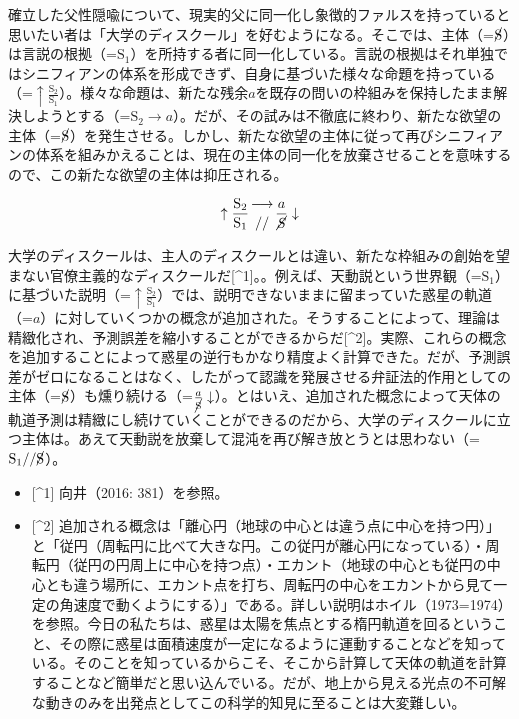 確立した父性隠喩について、現実的父に同一化し象徴的ファルスを持っていると思いたい者は「大学のディスクール」を好むようになる。そこでは、主体（=\(\cancel{\textrm{S}}\)）は言説の根拠（=\(\textrm{S}_1\)）を所持する者に同一化している。言説の根拠はそれ単独ではシニフィアンの体系を形成できず、自身に基づいた様々な命題を持っている（=\(\uparrow\frac{\textrm{S}_2}{\textrm{S}_1}\)）。様々な命題は、新たな残余\(a\)を既存の問いの枠組みを保持したまま解決しようとする（=\(\textrm{S}_2\rightarrow a\)）。だが、その試みは不徹底に終わり、新たな欲望の主体（=\(\cancel{\textrm{S}}\)）を発生させる。しかし、新たな欲望の主体に従って再びシニフィアンの体系を組みかえることは、現在の主体の同一化を放棄させることを意味するので、この新たな欲望の主体は抑圧される。

\[
\uparrow\frac{\mathrm{S_2}}{\mathrm{S_1}}\genfrac{}{}{0pt}{}{\longrightarrow}{//}\frac{a}{\mathrm{\cancel{S}}}\downarrow
\]

大学のディスクールは、主人のディスクールとは違い、新たな枠組みの創始を望まない官僚主義的なディスクールだ{[}\^{}1{]}。。例えば、天動説という世界観（=\(\textrm{S}_1\)）に基づいた説明（=\(\uparrow\frac{\textrm{S}_2}{\textrm{S}_1}\)）では、説明できないままに留まっていた惑星の軌道（=\(a\)）に対していくつかの概念が追加された。そうすることによって、理論は精緻化され、予測誤差を縮小することができるからだ{[}\^{}2{]}。実際、これらの概念を追加することによって惑星の逆行もかなり精度よく計算できた。だが、予測誤差がゼロになることはなく、したがって認識を発展させる弁証法的作用としての主体（=\(\cancel{\textrm{S}}\)）も燻り続ける（=\(\frac{a}{\cancel{\textrm{S}}}\downarrow\)）。とはいえ、追加された概念によって天体の軌道予測は精緻にし続けていくことができるのだから、大学のディスクールに立つ主体は。あえて天動説を放棄して混沌を再び解き放とうとは思わない（=\(\textrm{S}_1//\cancel{\textrm{S}}\)）。

\begin{itemize}
\tightlist
\item
  {[}\^{}1{]} 向井（2016: 381）を参照。
\item
  {[}\^{}2{]}
  追加される概念は「離心円（地球の中心とは違う点に中心を持つ円）」と「従円（周転円に比べて大きな円。この従円が離心円になっている）・周転円（従円の円周上に中心を持つ点）・エカント（地球の中心とも従円の中心とも違う場所に、エカント点を打ち、周転円の中心をエカントから見て一定の角速度で動くようにする）」である。詳しい説明はホイル（1973=1974）を参照。今日の私たちは、惑星は太陽を焦点とする楕円軌道を回るということ、その際に惑星は面積速度が一定になるように運動することなどを知っている。そのことを知っているからこそ、そこから計算して天体の軌道を計算することなど簡単だと思い込んでいる。だが、地上から見える光点の不可解な動きのみを出発点としてこの科学的知見に至ることは大変難しい。
\end{itemize}

